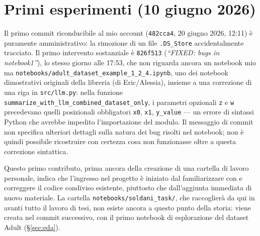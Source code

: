 \section{Primi esperimenti (10 giugno 2026)}

Il primo commit riconducibile al mio account (\texttt{482cca4}, 20 giugno 2026, 12:11) è puramente amministrativo: la rimozione di un file \texttt{.DS\_Store} accidentalmente tracciato. Il primo intervento sostanziale è \texttt{826f513} (\emph{``FIXED: bugs in notebook1''}), lo stesso giorno alle 17:53, che non riguarda ancora un notebook mio ma \texttt{notebooks/adult\_dataset\_example\_1\_2\_4.ipynb}, uno dei notebook dimostrativi originali della libreria (di Eric/Alessia), insieme a una correzione di una riga in \texttt{src/llm.py}: nella funzione \texttt{summarize\_\allowbreak with\_llm\_\allowbreak combined\_\allowbreak dataset\_only}, i parametri opzionali \texttt{z} e \texttt{w} precedevano quelli posizionali obbligatori \texttt{x0}, \texttt{x1}, \texttt{y\_value} --- un errore di sintassi Python che avrebbe impedito l'importazione del modulo. Il messaggio di commit non specifica ulteriori dettagli sulla natura dei bug risolti nel notebook; non è quindi possibile ricostruire con certezza cosa non funzionasse oltre a questa correzione sintattica.

Questo primo contributo, prima ancora della creazione di una cartella di lavoro personale, indica che l'ingresso nel progetto è iniziato dal familiarizzare con e correggere il codice condiviso esistente, piuttosto che dall'aggiunta immediata di nuovo materiale. La cartella \texttt{notebooks/soldani\_task/}, che raccoglierà da qui in avanti tutto il lavoro di tesi, non esiste ancora a questo punto della storia: viene creata nel commit successivo, con il primo notebook di esplorazione del dataset Adult (\S\ref{sec:eda}).

